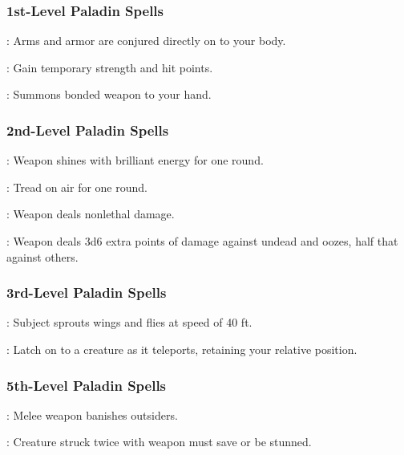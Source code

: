 \subsubsection{1st-Level Paladin Spells}
\begin{list}{}{\leftmargin=1em}
 \item {}: Arms and armor are conjured directly on to your body.
 \item {}: Gain temporary strength and hit points.
 \item {}: Summons bonded weapon to your hand.
\end{list}
\subsubsection{2nd-Level Paladin Spells}
\begin{list}{}{\leftmargin=1em}
 \item {}: Weapon shines with brilliant energy for one round.
 \item {}: Tread on air for one round.
 \item {}: Weapon deals nonlethal damage.
 \item {}: Weapon deals 3d6 extra points of damage against undead and oozes, half that against others.
\end{list}
\subsubsection{3rd-Level Paladin Spells}
\begin{list}{}{\leftmargin=1em}
 \item {}: Subject sprouts wings and flies at speed of 40 ft.
 \item {}: Latch on to a creature as it teleports, retaining your relative position.
\end{list}
\subsubsection{5th-Level Paladin Spells}
\begin{list}{}{\leftmargin=1em}
 \item {}: Melee weapon banishes outsiders.
 \item {}: Creature struck twice with weapon must save or be stunned.
\end{list}
